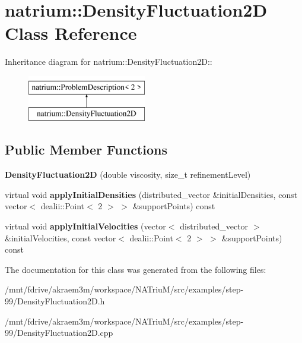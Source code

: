 \hypertarget{classnatrium_1_1DensityFluctuation2D}{
\section{natrium::DensityFluctuation2D Class Reference}
\label{classnatrium_1_1DensityFluctuation2D}
}
Inheritance diagram for natrium::DensityFluctuation2D::\begin{figure}[H]
\begin{center}
\leavevmode
\includegraphics[height=2cm]{classnatrium_1_1DensityFluctuation2D}
\end{center}
\end{figure}
\subsection*{Public Member Functions}
\begin{DoxyCompactItemize}
\item 
\hypertarget{classnatrium_1_1DensityFluctuation2D_aac8ea303ea740e73868cd1ee431e182f}{
{\bfseries DensityFluctuation2D} (double viscosity, size\_\-t refinementLevel)}
\label{classnatrium_1_1DensityFluctuation2D_aac8ea303ea740e73868cd1ee431e182f}

\item 
\hypertarget{classnatrium_1_1DensityFluctuation2D_a7d345499b56b65e0b107defcd5c89e2e}{
virtual void {\bfseries applyInitialDensities} (distributed\_\-vector \&initialDensities, const vector$<$ dealii::Point$<$ 2 $>$ $>$ \&supportPoints) const }
\label{classnatrium_1_1DensityFluctuation2D_a7d345499b56b65e0b107defcd5c89e2e}

\item 
\hypertarget{classnatrium_1_1DensityFluctuation2D_a217a8d3635da81fb0350671a86142b57}{
virtual void {\bfseries applyInitialVelocities} (vector$<$ distributed\_\-vector $>$ \&initialVelocities, const vector$<$ dealii::Point$<$ 2 $>$ $>$ \&supportPoints) const }
\label{classnatrium_1_1DensityFluctuation2D_a217a8d3635da81fb0350671a86142b57}

\end{DoxyCompactItemize}


The documentation for this class was generated from the following files:\begin{DoxyCompactItemize}
\item 
/mnt/fdrive/akraem3m/workspace/NATriuM/src/examples/step-\/99/DensityFluctuation2D.h\item 
/mnt/fdrive/akraem3m/workspace/NATriuM/src/examples/step-\/99/DensityFluctuation2D.cpp\end{DoxyCompactItemize}
